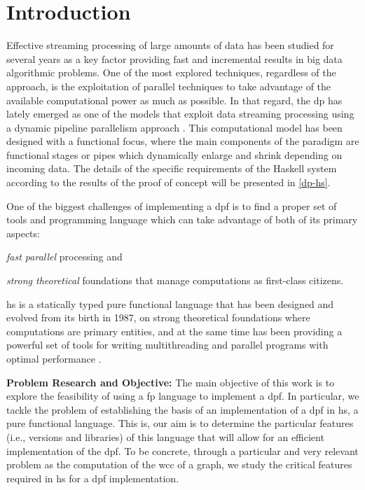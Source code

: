 \section{Introduction}\label{intro}
Effective streaming processing of large amounts of data has been studied for several years \cite{enumeratingsg, exploting, onthefly} 
as a key factor providing fast and incremental results in big data algorithmic problems. One of the most explored techniques, 
regardless of the approach, is the exploitation of parallel techniques to take advantage of the available computational power as much as possible. 
In that regard, the \acrfull{dp} \cite{dpdef} has lately emerged as one of the models that exploit data streaming processing using a dynamic pipeline parallelism approach \cite{onthefly}. 
This computational model has been designed with a functional focus, where the main components of the paradigm are functional stages or pipes which dynamically enlarge and shrink depending on incoming data.  
The details of the specific requirements of the Haskell system according to the results of the proof of concept will be presented in \autoref{dp-hs}.

One of the biggest challenges of implementing a \acrfull{dpf} is to find a proper set of tools and programming language which can take advantage of both of its primary aspects: \begin{inparaenum}[i\upshape)]
\item  \emph{fast parallel} processing and 
\item  \emph{strong theoretical} foundations that manage computations as first-class citizens.
 \end{inparaenum}
\acrfull{hs} is a statically typed pure functional language that has been designed and evolved from its birth in 1987, 
on strong theoretical foundations where computations are primary entities, and at the same time has been providing a powerful set of tools for writing multithreading and parallel programs with optimal performance \cite{parallelbook, monadpar}.

\textbf{Problem Research and Objective:}\label{research:obj} The main objective of this work is to explore the feasibility of using a  \acrfull{fp} language to implement a \acrshort{dpf}. In particular, we tackle the problem of establishing the basis of an implementation of a \acrshort{dpf}  in \acrshort{hs}, a pure functional language. 
This is,  our aim is to determine the particular features (i.e., versions and libraries) of this language that will allow for an efficient implementation of the \acrshort{dpf}. 
To be concrete, through a particular and very relevant problem as the computation of the \acrfull{wcc} of a graph,  we study the critical features required in \acrshort{hs} for a \acrshort{dpf} implementation.


